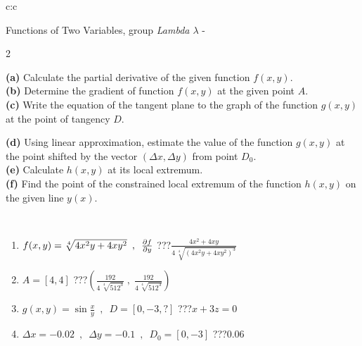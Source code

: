 \documentclass[10pt]{report}
\begin{document}
\begin{tabular}{c:c}
\begin{minipage}[c][104.5mm][t]{0.5\linewidth}
\begin{center}
\vspace{7mm}
{\huge \LARGE Functions of Two Variables, group \textit{Lambda $\lambda$} -}\\[5mm]
\begin{minipage}{0.95\linewidth}
\begin{center}
{\small \begin{multicols}{2} \raggedright
\textbf{(a)} Calculate the partial derivative of the given function \(f(x,y)\). \\[1mm]
\textbf{(b)} Determine the gradient of function \(f(x,y)\) at the given point \(A\). \\[1mm]
\textbf{(c)} Write the equation of the tangent plane to the graph of the function \(g(x,y)\) at the point of tangency \(D\). \par \columnbreak
\textbf{(d)} Using linear approximation, estimate the value of the function \(g(x,y)\) at the point shifted by the vector \((\Delta x, \Delta y)\) from point \(D_0\). \\[1mm]
\textbf{(e)} Calculate \(h(x,y)\) at its local extremum. \\[1mm]
\textbf{(f)} Find the point of the constrained local extremum of the function \(h(x,y)\) on the given line \(y(x)\). \\[1mm]
\end{multicols}
}
\end{center}
\end{minipage}
\\[4mm]
\begin{minipage}{0.79\linewidth}
\begin{center}
\begin{varwidth}{\linewidth}
\begin{enumerate}
\normalsizerr
\item $f(x,y) = \sqrt[4]{4x^2y + 4xy^2}\enspace , \enspace \pdv{f}{y}$\quad \dotfill\; ???\;\dotfill \quad $\frac{4x^2+4xy}{4\,\sqrt[4]{(4x^2y+4xy^2)^{3}}}$
\item $A = [4, 4]$\quad \dotfill\; ???\;\dotfill \quad $\left( \frac{192}{4\,\sqrt[4]{512^3}} \;,\; \frac{192}{4\,\sqrt[4]{512^3}} \right)$
\item $g(x,y) = \sin\frac{x}{y} \enspace , \enspace D = [0, -3, ?]$\quad \dotfill\; ???\;\dotfill \quad $x+3z=0$
\item $\Delta x = {-0.02} \enspace,\enspace \Delta y = {-0.1} \enspace,\enspace D_0 = [0,-3]$\quad \dotfill\; ???\;\dotfill \quad $0.06$

\end{enumerate}
\end{varwidth}
\end{center}
\end{minipage}
\end{center}
\end{minipage}
\end{tabular}
\end{document}
